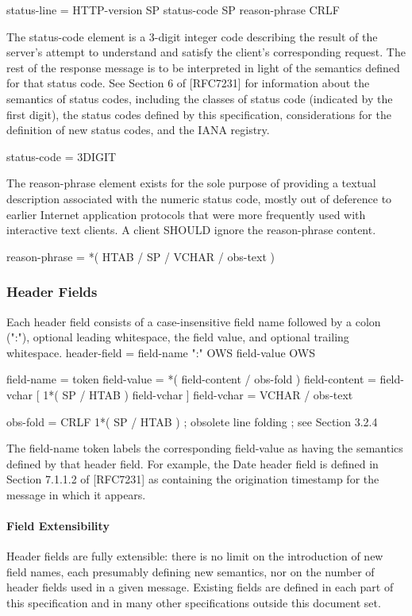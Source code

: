      status-line = HTTP-version SP status-code SP reason-phrase CRLF

   The status-code element is a 3-digit integer code describing the
   result of the server's attempt to understand and satisfy the client's
   corresponding request.  The rest of the response message is to be
   interpreted in light of the semantics defined for that status code.
   See Section 6 of [RFC7231] for information about the semantics of
   status codes, including the classes of status code (indicated by the
   first digit), the status codes defined by this specification,
   considerations for the definition of new status codes, and the IANA
   registry.

     status-code    = 3DIGIT

   The reason-phrase element exists for the sole purpose of providing a
   textual description associated with the numeric status code, mostly
   out of deference to earlier Internet application protocols that were
   more frequently used with interactive text clients.  A client SHOULD
   ignore the reason-phrase content.

     reason-phrase  = *( HTAB / SP / VCHAR / obs-text )

\subsubsection {Header Fields}
Each header field consists of a case-insensitive field name followed
by a colon (":"), optional leading whitespace, the field value, and
optional trailing whitespace.
header-field   = field-name ":" OWS field-value OWS

field-name     = token
field-value    = *( field-content / obs-fold )
field-content  = field-vchar [ 1*( SP / HTAB ) field-vchar ]
field-vchar    = VCHAR / obs-text

obs-fold       = CRLF 1*( SP / HTAB )
               ; obsolete line folding
               ; see Section 3.2.4

The field-name token labels the corresponding field-value as having
the semantics defined by that header field.  For example, the Date
header field is defined in Section 7.1.1.2 of [RFC7231] as containing
the origination timestamp for the message in which it appears.
\paragraph{Field Extensibility}
Header fields are fully extensible: there is no limit on the
introduction of new field names, each presumably defining new
semantics, nor on the number of header fields used in a given
message.  Existing fields are defined in each part of this
specification and in many other specifications outside this document
set.

